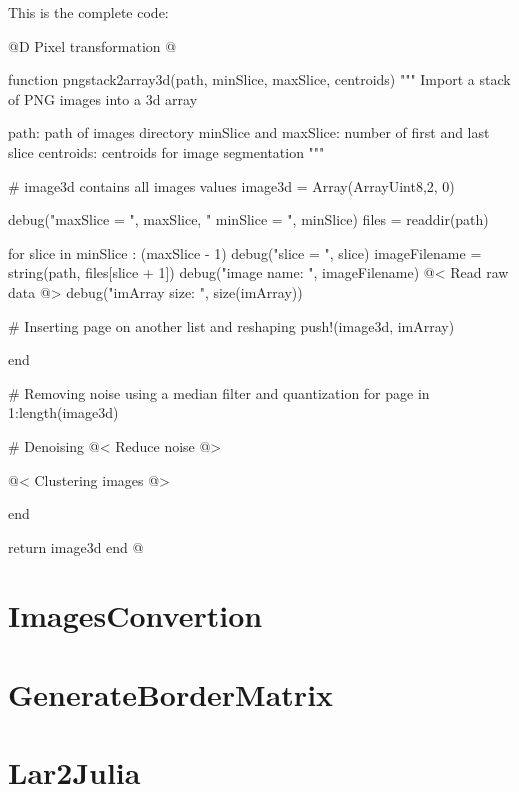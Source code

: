 \documentclass[11pt,oneside]{article}	%
\begin{document}
This is the complete code:

@D Pixel transformation
@{function pngstack2array3d(path, minSlice, maxSlice, centroids)
  """
  Import a stack of PNG images into a 3d array

  path: path of images directory
  minSlice and maxSlice: number of first and last slice
  centroids: centroids for image segmentation
  """

  # image3d contains all images values
  image3d = Array(Array{Uint8,2}, 0)

  debug("maxSlice = ", maxSlice, " minSlice = ", minSlice)
  files = readdir(path)

  for slice in minSlice : (maxSlice - 1)
    debug("slice = ", slice)
    imageFilename = string(path, files[slice + 1])
    debug("image name: ", imageFilename)
    @< Read raw data @>
    debug("imArray size: ", size(imArray))

    # Inserting page on another list and reshaping
    push!(image3d, imArray)

  end

  # Removing noise using a median filter and quantization
  for page in 1:length(image3d)

    # Denoising
    @< Reduce noise @>

    @< Clustering images @>

  end

  return image3d
end
@}

\section{ImagesConvertion}\label{sec:ImagesConvertion}

\section{GenerateBorderMatrix}\label{sec:GenerateBorderMatrix}

\section{Lar2Julia}\label{sec:Lar2Julia}
\end{document}

